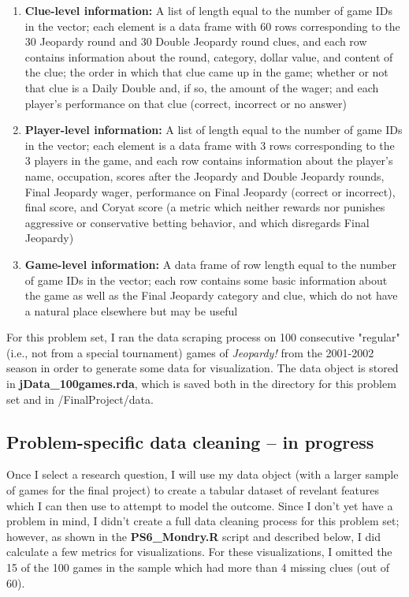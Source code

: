 \documentclass{article}
\begin{document}
\begin{enumerate}
	
	\item \textbf{Clue-level information:} A list of length equal to the number of game IDs in the vector; each element is a data frame with 60 rows corresponding to the 30 Jeopardy round and 30 Double Jeopardy round clues, and each row contains information about the round, category, dollar value, and content of the clue; the order in which that clue came up in the game; whether or not that clue is a Daily Double and, if so, the amount of the wager; and each player's performance on that clue (correct, incorrect or no answer)
	
	\item \textbf{Player-level information:} A list of length equal to the number of game IDs in the vector; each element is a data frame with 3 rows corresponding to the 3 players in the game, and each row contains information about the player's name, occupation, scores after the Jeopardy and Double Jeopardy rounds, Final Jeopardy wager, performance on Final Jeopardy (correct or incorrect), final score, and Coryat score (a metric which neither rewards nor punishes aggressive or conservative betting behavior, and which disregards Final Jeopardy)
	
	\item \textbf{Game-level information:} A data frame of row length equal to the number of game IDs in the vector; each row contains some basic information about the game as well as the Final Jeopardy category and clue, which do not have a natural place elsewhere but may be useful
	
\end{enumerate}

For this problem set, I ran the data scraping process on 100 consecutive "regular" (i.e., not from a special tournament) games of \textit{Jeopardy!} from the 2001-2002 season in order to generate some data for visualization. The data object is stored in \textbf{jData\_100games.rda}, which is saved both in the directory for this problem set and in /FinalProject/data.

\subsection{Problem-specific data cleaning -- in progress}

Once I select a research question, I will use my data object (with a larger sample of games for the final project) to create a tabular dataset of revelant features which I can then use to attempt to model the outcome. Since I don't yet have a problem in mind, I didn't create a full data cleaning process for this problem set; however, as shown in the \textbf{PS6\_Mondry.R} script and described below, I did calculate a few metrics for visualizations. For these visualizations, I omitted the 15 of the 100 games in the sample which had more than 4 missing clues (out of 60).
\end{document}
